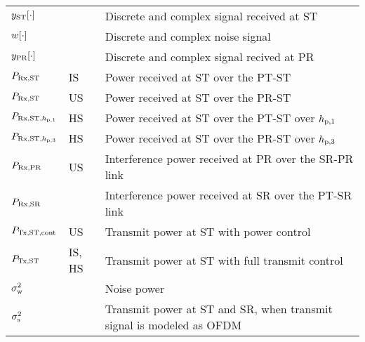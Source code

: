 \begin{longtable}{p{}p{}p{}}
	$y_{\text{ST}}[\cdot]$       & &             Discrete and complex signal received at ST \\	
	
	$w[\cdot]$       & &             Discrete and complex noise signal \\	

	$y_{\text{PR}}[\cdot]$       & &             Discrete and complex signal recived at PR \\	
	$P_{\text{Rx,ST}}$  		& IS &		Power received at ST over the PT-ST \\ 
	$P_{\text{Rx,ST}}$  		& US &		Power received at ST over the PR-ST \\ 
	$P_{\text{Rx,ST,$h_{\text{p,1}}$}}$  		& HS &		Power received at ST over the PT-ST over $h_{\text{p,1}}$ \\ 
	$P_{\text{Rx,ST,$h_{\text{p,3}}$}}$  		& HS &		Power received at ST over the PR-ST over $h_{\text{p,3}}$ \\ 
	$P_{\text{Rx,PR}}$  		& US &		Interference power received at PR over the SR-PR link \\
	$P_{\text{Rx,SR}}$  		& &		Interference power received at SR over the PT-SR link\\ 

	$P_{\text{Tx,ST,cont}}$	  		& US &  	Transmit power at ST with power control \\
	$P_{\text{Tx,ST}}$ 		& IS, HS&  	Transmit power at ST with full transmit control \\

	$\sigma^2_{\text{w}}$	 		& & 	Noise power \\
	$\sigma^2_{\text{s}}$	 		& &  Transmit power at ST and SR, when transmit signal is modeled as OFDM  \\


\end{longtable}
